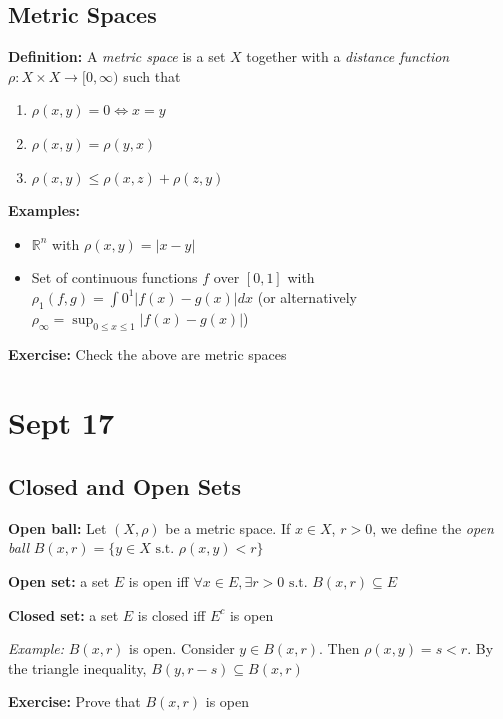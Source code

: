 \documentclass[12pt]{report}
\newcommand{\R}{\mathbb{R}}
\newcommand{\abs}[1]{\left\vert #1 \right\vert}
\newcommand{\sub}{\subseteq}
\newcommand{\st}{\text{ s.t. }}
\newenvironment*{exercise}[1][red]{
    \begin{tcolorbox}[
        parbox=false,
        colback=#1!5!white,
        colframe=#1!75!black,
        breakable
    ]}
    {\end{tcolorbox}}
\begin{document}
    \subsection*{Metric Spaces}
    \textbf{Definition:} A \emph{metric space} is a set $X$ together with a \emph{distance function} $\rho: X \times X \to [0, \infty)$ such that 
    \begin{enumerate}
        \item $\rho(x, y) = 0 \iff x = y$
        \item $\rho(x, y) = \rho(y, x)$
        \item $\rho(x, y) \leq \rho(x, z) + \rho(z, y)$
    \end{enumerate}

    \textbf{Examples:} 
    \begin{itemize}
        \item $\R^n$ with $\rho(x, y) = \abs{x - y}$
        \item Set of continuous functions $f$ over $[0, 1]$ with $\rho_1(f, g) = \int0^1 \abs{f(x) - g(x)} dx$ (or alternatively $\rho_{\infty} = \sup_{0 \leq x \leq 1} \abs{f(x) - g(x)}$)
    \end{itemize}
 
    \begin{exercise}
        \textbf{Exercise:} Check the above are metric spaces
    \end{exercise}

\section*{Sept 17}
\subsection*{Closed and Open Sets}  
    \textbf{Open ball:} Let $(X, \rho)$ be a metric space. If $x \in X$, $r > 0$, we define the \emph{open ball} $B(x, r) = \{y \in X \st \rho(x, y) < r\}$

    \textbf{Open set:} a set $E$ is open iff $\forall x \in E, \exists r > 0 \st B(x, r) \sub E$

    \textbf{Closed set:} a set $E$ is closed iff $E^c$ is open

    \emph{Example:} $B(x, r)$ is open. Consider $y \in B(x, r)$. Then $\rho(x, y) = s < r$. By the triangle inequality, $B(y, r - s) \sub B(x, r)$ 

    \begin{exercise}
        \textbf{Exercise:} Prove that $B(x, r)$ is open
    \end{exercise}
\end{document}
